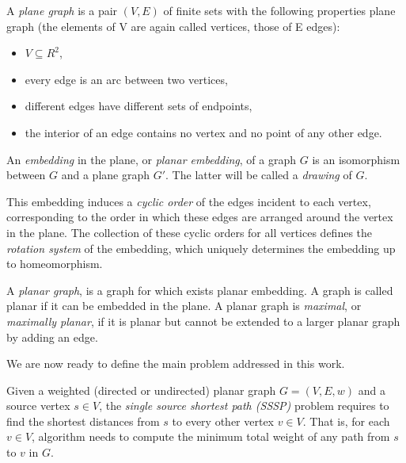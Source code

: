 \begin{defn}
    A \emph{plane graph} is a pair $(V,E)$ of finite sets with the following properties plane graph (the elements of V are again called vertices, those of E edges):
    \begin{itemize}
        \item $V \subseteq R^2$,
        \item every edge is an arc between two vertices,
        \item different edges have different sets of endpoints,
        \item the interior of an edge contains no vertex and no point of any other edge.
    \end{itemize}
\end{defn}

\begin{defn} 
An \emph{embedding} in the plane, or \emph{planar embedding}, of a graph $G$ is an isomorphism between $G$ and a plane graph $G'$. The latter will be called a \emph{drawing} of $G$.

This embedding induces a \emph{cyclic order} of the edges incident to each vertex, corresponding to the order in which these edges are arranged around the vertex in the plane. The collection of these cyclic orders for all vertices defines the \emph{rotation system} of the embedding, which uniquely determines the embedding up to homeomorphism.
\end{defn}

\begin{defn} 
    A \emph{planar graph}, is a graph for which exists planar embedding. A graph is called planar if it can be embedded in the plane. A planar graph is \emph{maximal}, or \emph{maximally planar}, if it is planar but cannot be extended to a larger planar graph by adding an edge.
\end{defn}

We are now ready to define the main problem addressed in this work.

\begin{defn}
Given a weighted (directed or undirected) planar graph $G = (V, E, w)$ and a source vertex $s \in V$, the \emph{single source shortest path (SSSP)} problem requires to find the shortest distances from $s$ to every other vertex $v \in V$. That is, for each $v \in V$, algorithm needs to compute the minimum total weight of any path from $s$ to $v$ in $G$.
\end{defn}

